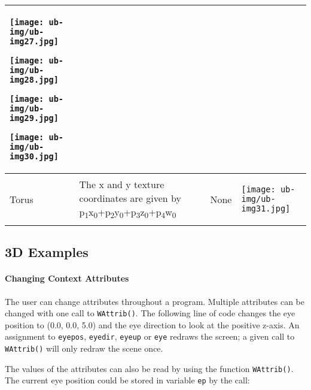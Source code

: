 \begin{center}
\begin{xtabular}{|m{0.712in}|m{3.36in}|m{0.9in}|m{0.7in}|}
\begin{center}
\texttt{[image: ub-img/ub-img27.jpg]}
\end{center}
\begin{center}
\texttt{[image: ub-img/ub-img28.jpg]}
\end{center}
\begin{center}
\texttt{[image: ub-img/ub-img29.jpg]}
\end{center}
\begin{center}
\texttt{[image: ub-img/ub-img30.jpg]}
\end{center}
\\\hline
Torus &
The x and y texture coordinates are given by
p\textsubscript{1}x\textsubscript{0}+p\textsubscript{2}y\textsubscript{0}+p\textsubscript{3}z\textsubscript{0}+p\textsubscript{4}w\textsubscript{0}
&
None &
\begin{center}
\texttt{[image: ub-img/ub-img31.jpg]}
\end{center}
\\\hline
\end{xtabular}
\end{center}

\subsection*{3D Examples}

\paragraph{Changing Context Attributes}
The user can change attributes throughout a program. Multiple
attributes can be changed with one call to \texttt{WAttrib()}.  The
following line of code changes the eye position to (0.0, 0.0, 5.0) and
the eye direction to look at the positive z-axis. An assignment to
\texttt{eyepos}, \texttt{eyedir}, \texttt{eyeup} or \texttt{eye}
redraws the screen; a given call to \texttt{WAttrib()} will only
redraw the scene once.


The values of the attributes can also be read by using the function
\texttt{WAttrib()}. The current eye position could be stored in variable
\texttt{ep} by the call:


